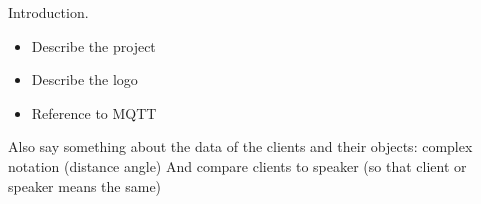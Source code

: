 Introduction.

\begin{itemize}
\item Describe the project
\item Describe the logo
\item Reference to MQTT
\end{itemize}

Also say something about the data of the clients and their objects: complex notation (distance angle)
And compare clients to speaker (so that client or speaker means the same)
